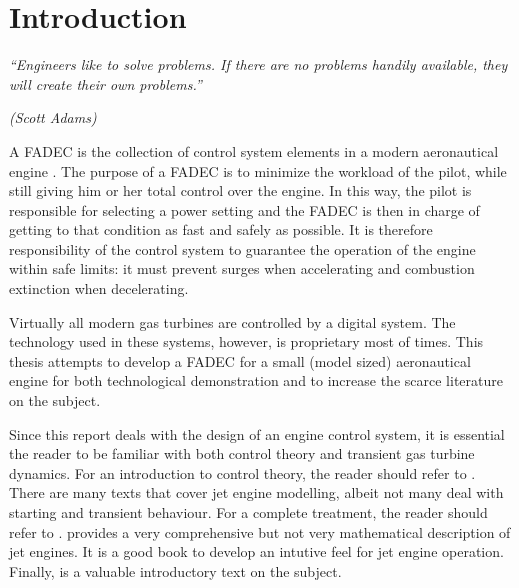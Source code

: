 \documentclass[tcc]{subfiles}
\begin{document}
\chapter{Introduction}
\label{ch:intro}
\epigraph{\em ``Engineers like to solve problems. If there are no problems handily available,
                they will create their own problems.''
         }{\em(Scott Adams)}

A \gls{FADEC} is the collection of control system elements in 
 a modern aeronautical engine \cite{rolls-royce}.
The purpose of a \gls{FADEC} is to minimize the workload of the pilot,
 while still giving him or her total control over the engine.
In this way, the pilot is responsible for selecting a power setting 
 and the \gls{FADEC} is then in charge of getting to that condition
 as fast and safely as possible. It is therefore responsibility of the
 control system to guarantee the operation of the engine within safe limits:
 it must prevent surges when accelerating 
 and combustion extinction when decelerating.

Virtually all modern gas turbines are controlled by a digital system.
The technology used in these systems, however, is proprietary most of times.
This thesis attempts to develop a \gls{FADEC} 
for a small (model sized) aeronautical engine for both technological demonstration 
and to increase the scarce literature on the subject.

Since this report deals with the design of an engine control system,
 it is essential the reader to be familiar with both control theory and transient gas turbine dynamics.
For an introduction to control theory, the reader should refer to 
 \textcite{dorf2011modern,franklinfeedback}.
There are many texts that cover jet engine modelling, 
 albeit not many deal with starting and transient behaviour. 
For a complete treatment, the reader should refer to \textcite{walsh2004gas}. 
\textcite{rolls-royce} provides a very comprehensive 
 but not very mathematical description of jet engines. 
 It is a good book to develop an intutive feel for jet engine operation. 
Finally, \textcite{Cumpsty2015} is a valuable introductory text on the subject.
\end{document}
